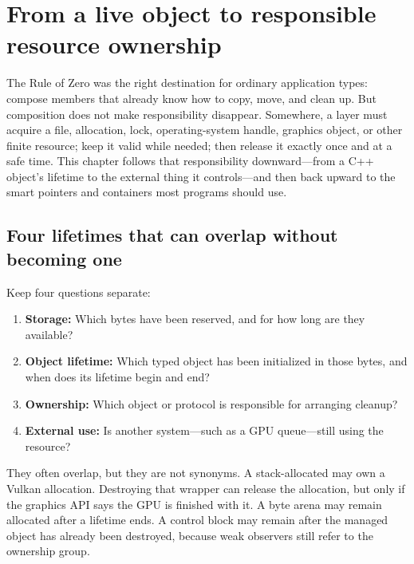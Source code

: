 \section{From a live object to responsible resource ownership}\label{01-foundations-i-ch004-from-a-live-object-to-responsible-resource-ownership}

\hypertarget{01-foundations-i-ch004-from-a-live-object-to-responsible-resource-ownership}{}

The Rule of Zero was the right destination for ordinary application types: compose members that already know how to copy, move, and clean up. But composition does not make responsibility disappear. Somewhere, a layer must acquire a file, allocation, lock, operating-system handle, graphics object, or other finite resource; keep it valid while needed; then release it exactly once and at a safe time. This chapter follows that responsibility downward---from a C++ object's lifetime to the external thing it controls---and then back upward to the smart pointers and containers most programs should use.

\subsection{Four lifetimes that can overlap without becoming one}\label{01-foundations-i-ch004-four-lifetimes-that-can-overlap-without-becoming-one}

\hypertarget{01-foundations-i-ch004-four-lifetimes-that-can-overlap-without-becoming-one}{}

Keep four questions separate:

\begin{enumerate}
\def\labelenumi{\arabic{enumi}.}
\tightlist
\item
  \textbf{Storage:} Which bytes have been reserved, and for how long are they available?
\item
  \textbf{Object lifetime:} Which typed object has been initialized in those bytes, and when does its lifetime begin and end?
\item
  \textbf{Ownership:} Which object or protocol is responsible for arranging cleanup?
\item
  \textbf{External use:} Is another system---such as a GPU queue---still using the resource?
\end{enumerate}

They often overlap, but they are not synonyms. A stack-allocated  may own a Vulkan allocation. Destroying that wrapper can release the allocation, but only if the graphics API says the GPU is finished with it. A byte arena may remain allocated after a  lifetime ends. A  control block may remain after the managed object has already been destroyed, because weak observers still refer to the ownership group.

